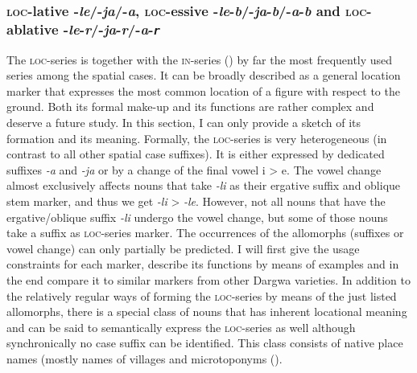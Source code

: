 
\subsubsection{\textsc{loc}-lative -\textit{le}/-\textit{ja}/-\textit{a}, \textsc{loc}-essive -\textit{le}-\textit{b}/-\textit{ja}-\textit{b}/-\textit{a}-\textit{b} and \textsc{loc}-ablative -\textit{le}-\textit{r}/-\textit{ja}-\textit{r}/-\textit{a}-\textit{\texttt{r}}}
\label{sssec:spr-lative -le/-ja/-a, spr-essive -le-b/-ja-b/-a-b and spr-ablative -le-r/-ja-r/-a-r} 

The \textsc{loc}-series is together with the \textsc{in}-series () by far the most frequently used series among the spatial cases. It can be broadly described as a general location marker that expresses the most common location of a figure with respect to the ground. Both its formal make-up and its functions are rather complex and deserve a future study. In this section, I can only provide a sketch of its formation and its meaning. Formally, the \textsc{loc}-series is very heterogeneous (in contrast to all other spatial case suffixes). It is either expressed by dedicated suffixes \textit{-a} and \textit{-ja} or by a change of the final vowel i > e. The vowel change almost exclusively affects nouns that take \textit{-li} as their ergative suffix and oblique stem marker, and thus we get \textit{-li} > \textit{-le}. However, not all nouns that have the ergative\slash oblique suffix \textit{-li} undergo the vowel change, but some of those nouns take a suffix as \textsc{loc}-series marker. The occurrences of the allomorphs (suffixes or vowel change) can only partially be predicted. I will first give the usage constraints for each marker, describe its functions by means of examples and in the end compare it to similar markers from other Dargwa varieties. In addition to the relatively regular ways of forming the \textsc{loc}-series by means of the just listed allomorphs, there is a special class of nouns that has inherent locational meaning and can be said to semantically express the \textsc{loc}-series as well although synchronically no case suffix can be identified. This class consists of native place names (mostly names of villages and microtoponyms ().

